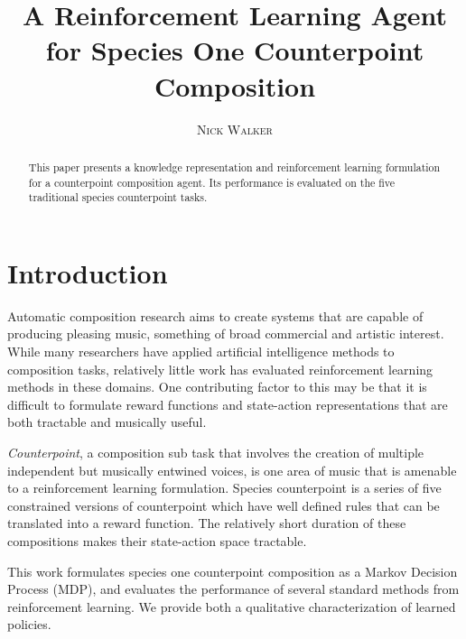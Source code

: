 \documentclass{article}
\title{A Reinforcement Learning Agent for Species One Counterpoint Composition}
\author{\textsc{Nick Walker}}
\date{}
\begin{document}
\twocolumn
	\maketitle %



	\begin{abstract}
	This paper presents a knowledge representation and reinforcement learning formulation for a counterpoint composition agent. Its performance is evaluated on the five traditional species counterpoint tasks.
	\end{abstract}


	\section{Introduction}
    Automatic composition research aims to create systems that are capable of producing pleasing music, something of broad commercial and artistic interest. While many researchers have applied artificial intelligence methods to composition tasks, relatively little work has evaluated reinforcement learning methods in these domains. One contributing factor to this may be that it is difficult to formulate reward functions and state-action representations that are both tractable and musically useful.

    \textit{Counterpoint}, a composition sub task that involves the creation of multiple independent but musically entwined voices, is one area of music that is amenable to a reinforcement learning formulation. Species counterpoint is a series of five constrained versions of counterpoint \cite{Kostka2012} which have well defined rules that can be translated into a reward function. The relatively short duration of these compositions makes their state-action space tractable.

    This work formulates species one counterpoint composition as a Markov Decision Process (MDP), and evaluates the performance of several standard methods from reinforcement learning. We provide both a qualitative characterization of learned policies. 
\end{document}
